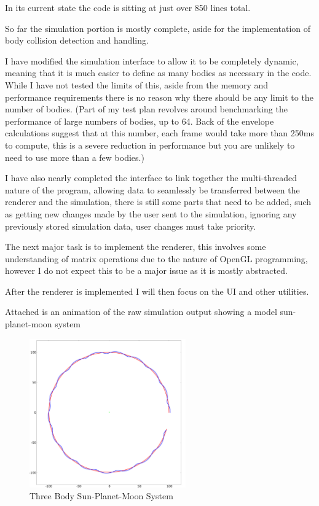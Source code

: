 {In its current state the code is sitting at just over 850 lines total.

So far the simulation portion is mostly complete, aside for the implementation of body collision detection and handling.

I have modified the simulation interface to allow it to be completely dynamic, meaning that it is much easier to define as many bodies as necessary in the code. While I have not tested the limits of this, aside from the memory and performance requirements there is no reason why there should be any limit to the number of bodies. (Part of my test plan revolves around benchmarking the performance of large numbers of bodies, up to 64. Back of the envelope calculations suggest that at this number, each frame would take more than 250ms to compute, this is a severe reduction in performance but you are unlikely to need to use more than a few bodies.)

I have also nearly completed the interface to link together the multi-threaded nature of the program, allowing data to seamlessly be transferred between the renderer and the simulation, there is still some parts that need to be added, such as getting new changes made by the user sent to the simulation, ignoring any previously stored simulation data, user changes must take priority.

The next major task is to implement the renderer, this involves some understanding of matrix operations due to the nature of OpenGL programming, however I do not expect this to be a major issue as it is mostly abstracted.

After the renderer is implemented I will then focus on the UI and other utilities.

Attached is an animation of the raw simulation output showing a model sun-planet-moon system

\begin{figure}[H]
  \centering
  \includegraphics[width=0.6\textwidth]{img/still.png}
  \caption{Three Body Sun-Planet-Moon System}
\end{figure}

}
